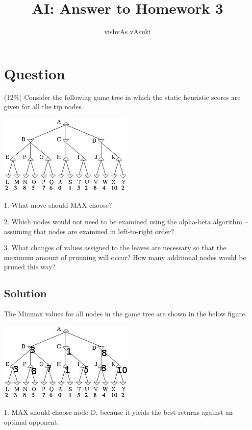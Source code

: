 \documentclass[a4paper,10pt]{article}
\title{AI: Answer to Homework 3}
\author{vishvAs vAsuki}
\begin{document}
\maketitle

\section{Question}

 (12\%) Consider the following game tree in which the static heuristic scores are given for all the tip nodes.
\begin{center}
 \includegraphics{gametree.jpg}
\end{center}


   1. What move should MAX choose?

   2. Which nodes would not need to be examined using the alpha-beta algorithm -- assuming that nodes are examined in left-to-right order?

   3. What changes of values assigned to the leaves are necessary so that the maximum amount of prunning will occur? How many additional nodes would be pruned this way? 


\subsection{Solution}
The Minmax values for all nodes in the game tree are shown in the below figure.
\begin{center}
 \includegraphics{gametreeSoln.jpg}
\end{center}

1. MAX should choose node D, because it yields the best returns against an optimal opponent.
\end{document}
